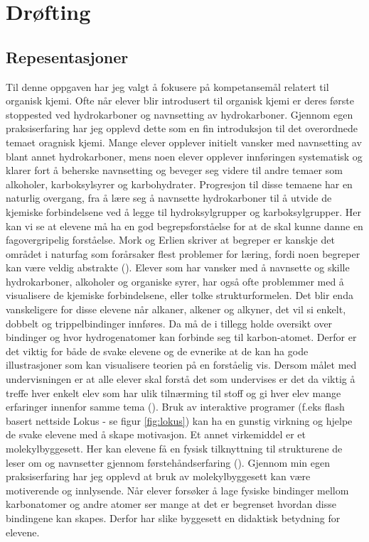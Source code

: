 \documentclass[main.tex]{subfiles}
\begin{document}
\section*{Drøfting}

\subsection*{Repesentasjoner}

Til denne oppgaven har jeg valgt å fokusere på kompetansemål relatert til organisk kjemi. Ofte når elever blir introdusert til organisk kjemi er deres første stoppested ved hydrokarboner og navnsetting av hydrokarboner. Gjennom egen praksiserfaring har jeg opplevd dette som en fin introduksjon til det overordnede temaet oragnisk kjemi. Mange elever opplever initielt vansker med navnsetting av blant annet hydrokarboner, mens noen elever opplever innføringen systematisk og klarer fort å beherske navnsetting og beveger seg videre til andre temaer som alkoholer, karboksylsyrer og karbohydrater. Progresjon til disse temaene har en naturlig overgang, fra å lære seg å navnsette hydrokarboner til å utvide de kjemiske forbindelsene ved å legge til hydroksylgrupper og karboksylgrupper. Her kan vi se at elevene må ha en god begrepsforståelse for at de skal kunne danne en fagovergripelig forståelse. Mork og Erlien skriver at begreper er kanskje det området i naturfag som forårsaker flest problemer for læring, fordi noen begreper kan være veldig abstrakte ().
\newline\newline
Elever som har vansker med å navnsette og skille hydrokarboner, alkoholer og organiske syrer, har også ofte problemmer med å visualisere de kjemiske forbindelsene, eller tolke strukturformelen. Det blir enda vanskeligere for disse elevene når alkaner, alkener og alkyner, det vil si enkelt, dobbelt og trippelbindinger innføres. Da må de i tillegg holde oversikt over bindinger og hvor hydrogenatomer kan forbinde seg til karbon-atomet. Derfor er det viktig for både de svake elevene og de evnerike at de kan ha gode illustrasjoner som kan visualisere teorien på en forståelig vis. Dersom målet med undervisningen er at alle elever skal forstå det som undervises er det da viktig å treffe  hver enkelt elev som har ulik tilnærming til stoff og gi hver elev mange erfaringer innenfor samme tema (). 
\newline\newline
Bruk av interaktive programer (f.eks flash basert nettside Lokus - se figur \ref{fig:lokus}) kan ha en gunstig virkning og hjelpe de svake elevene med å skape motivasjon. Et annet virkemiddel er et molekylbyggesett. Her kan elevene få en fysisk tilknyttning til strukturene de leser om og navnsetter gjennom førstehåndserfaring (). Gjennom min egen praksiserfaring har jeg opplevd at bruk av molekylbyggesett kan være motiverende og innlysende. Når elever forsøker å lage fysiske bindinger mellom karbonatomer og andre atomer ser mange at det er begrenset hvordan disse bindingene kan skapes. Derfor har slike byggesett en didaktisk betydning for elevene.\newline
\end{document}
